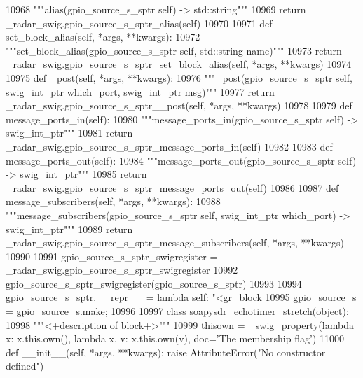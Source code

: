 \begin{DoxyCode}
{{{{{{{{{{{{{{{{{{{{{{{{{{{{{{{{{{10968         \textcolor{stringliteral}{"""alias(gpio\_source\_s\_sptr self) -> std::string"""}
10969         \textcolor{keywordflow}{return} \_radar\_swig.gpio\_source\_s\_sptr\_alias(self)
10970 
10971     \textcolor{keyword}{def }set_block_alias(self, *args, **kwargs):
10972         \textcolor{stringliteral}{"""set\_block\_alias(gpio\_source\_s\_sptr self, std::string name)"""}
10973         \textcolor{keywordflow}{return} \_radar\_swig.gpio\_source\_s\_sptr\_set\_block\_alias(self, *args, **kwargs)
10974 
10975     \textcolor{keyword}{def }_post(self, *args, **kwargs):
10976         \textcolor{stringliteral}{"""\_post(gpio\_source\_s\_sptr self, swig\_int\_ptr which\_port, swig\_int\_ptr msg)"""}
10977         \textcolor{keywordflow}{return} \_radar\_swig.gpio\_source\_s\_sptr\_\_post(self, *args, **kwargs)
10978 
10979     \textcolor{keyword}{def }message_ports_in(self):
10980         \textcolor{stringliteral}{"""message\_ports\_in(gpio\_source\_s\_sptr self) -> swig\_int\_ptr"""}
10981         \textcolor{keywordflow}{return} \_radar\_swig.gpio\_source\_s\_sptr\_message\_ports\_in(self)
10982 
10983     \textcolor{keyword}{def }message_ports_out(self):
10984         \textcolor{stringliteral}{"""message\_ports\_out(gpio\_source\_s\_sptr self) -> swig\_int\_ptr"""}
10985         \textcolor{keywordflow}{return} \_radar\_swig.gpio\_source\_s\_sptr\_message\_ports\_out(self)
10986 
10987     \textcolor{keyword}{def }message_subscribers(self, *args, **kwargs):
10988         \textcolor{stringliteral}{"""message\_subscribers(gpio\_source\_s\_sptr self, swig\_int\_ptr which\_port) -> swig\_int\_ptr"""}
10989         \textcolor{keywordflow}{return} \_radar\_swig.gpio\_source\_s\_sptr\_message\_subscribers(self, *args, **kwargs)
10990 
10991 gpio\_source\_s\_sptr\_swigregister = \_radar\_swig.gpio\_source\_s\_sptr\_swigregister
10992 gpio_source_s_sptr_swigregister(gpio\_source\_s\_sptr)
10993 
10994 gpio\_source\_s\_sptr.\_\_repr\_\_ = \textcolor{keyword}{lambda} self: \textcolor{stringliteral}{"<gr\_block %
10995 gpio\_source\_s = gpio\_source\_s.make;
10996 
10997 \textcolor{keyword}{class }soapysdr_echotimer_stretch(object):
10998     \textcolor{stringliteral}{"""<+description of block+>"""}
10999     thisown = _swig_property(\textcolor{keyword}{lambda} x: x.this.own(), \textcolor{keyword}{lambda} x, v: x.this.own(v), doc=\textcolor{stringliteral}{'The membership flag'})
11000     \textcolor{keyword}{def }__init__(self, *args, **kwargs): \textcolor{keywordflow}{raise} AttributeError(\textcolor{stringliteral}{"No constructor defined"})
}}}}}}}}}}}}}}}}}}}}}}}}}}}}}}}}}}}
\end{DoxyCode}
